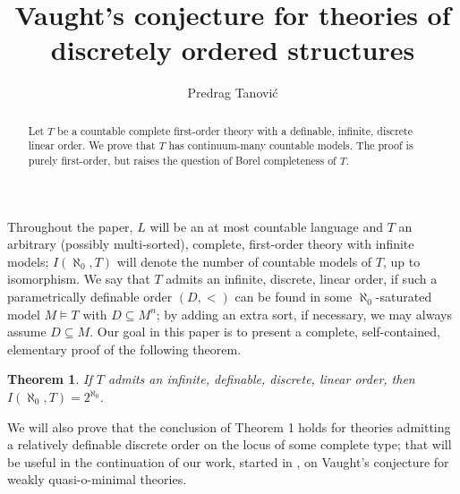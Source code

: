 \documentclass[12pt]{amsart}
\title{Vaught's conjecture for theories of discretely ordered structures}
\author{Predrag Tanovi\'c}
\newtheorem{Theorem1}{Theorem}
\theoremstyle{definition}
\begin{document}
\maketitle
\begin{abstract} 
Let $T$ be a countable
complete first-order theory with a definable, infinite, discrete linear order. We prove that $T$ has continuum-many countable models. The proof  is purely first-order,  but raises the question of Borel completeness of $T$.
\end{abstract}

\bigskip
Throughout the paper, $L$ will be an at most countable  language and $T$  an arbitrary (possibly multi-sorted), complete,  first-order theory with infinite models;  $I(\aleph_0,T)$ will denote the number of countable models of $T$, up to 
isomorphism.  We say that $T$  admits an infinite,  discrete, linear order, if such a parametrically definable order $(D,<)$ can be found in some   $\aleph_0$-saturated model $M\models T$ with $D\subseteq M^n$; by adding an extra sort, if necessary, we may always assume $D\subseteq M$. 
Our goal in this paper is to present a complete, self-contained, elementary   proof of the following theorem.

\begin{Theorem1}
If $T$ admits an infinite, definable, discrete, linear order, then $I(\aleph_0,T)=2^{\aleph_0}$. 
\end{Theorem1}

We will also prove that the conclusion of Theorem 1 holds for theories admitting a relatively definable discrete order on the locus of some complete type; that  will be useful in the continuation of our work, started in \cite{MT}, on Vaught's conjecture for weakly quasi-o-minimal theories. 
\end{document}
